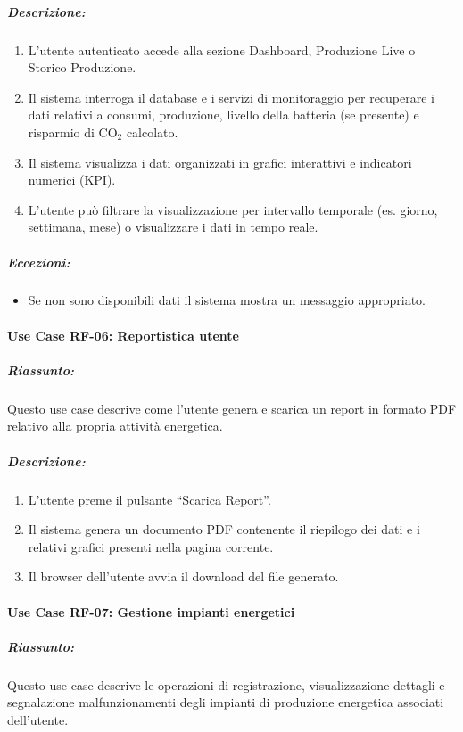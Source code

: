 \subparagraph*{Descrizione:}
\begin{enumerate}
    \item L’utente autenticato accede alla sezione Dashboard, Produzione Live o Storico Produzione.
    \item Il sistema interroga il database e i servizi di monitoraggio per recuperare i dati relativi a consumi, produzione, livello della batteria (se presente) e risparmio di CO$_2$ calcolato.
    \item Il sistema visualizza i dati organizzati in grafici interattivi e indicatori numerici (KPI).
    \item L'utente può filtrare la visualizzazione per intervallo temporale (es. giorno, settimana, mese) o visualizzare i dati in tempo reale.
\end{enumerate}

\subparagraph*{Eccezioni:}
\begin{itemize}
    \item Se non sono disponibili dati il sistema mostra un messaggio appropriato.
\end{itemize}

\paragraph*{Use Case RF-06: Reportistica utente}
\subparagraph*{Riassunto:}
Questo use case descrive come l'utente genera e scarica un report in formato PDF relativo alla propria attività energetica.

\subparagraph*{Descrizione:}
\begin{enumerate}
    \item L'utente preme il pulsante ``Scarica Report''.
    \item Il sistema genera un documento PDF contenente il riepilogo dei dati e i relativi grafici presenti nella pagina corrente.
    \item Il browser dell'utente avvia il download del file generato.
\end{enumerate}

\paragraph*{Use Case RF-07: Gestione impianti energetici}
\subparagraph*{Riassunto:}
Questo use case descrive le operazioni di registrazione, visualizzazione dettagli e segnalazione malfunzionamenti degli impianti di produzione energetica associati dell'utente.

